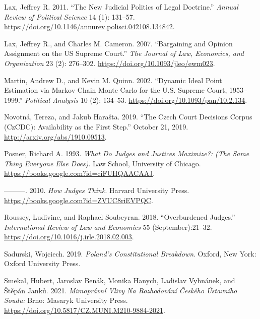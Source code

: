 \documentclass[
  11pt,
]{article}
\newlength{\cslhangindent}
\newenvironment{CSLReferences}[2] %
 {\begin{list}{}{%
  \setlength{\itemindent}{0pt}
  \setlength{\leftmargin}{0pt}
  \setlength{\parsep}{0pt}
  \ifodd #1
   \setlength{\leftmargin}{\cslhangindent}
   \setlength{\itemindent}{-1\cslhangindent}
  \fi
  \setlength{\itemsep}{#2\baselineskip}}}
 {\end{list}}
\begin{document}
\begin{CSLReferences}{1}{0}
Lax, Jeffrey R. 2011. {``The {New Judicial Politics} of {Legal Doctrine}.''} \emph{Annual Review of Political Science} 14 (1): 131--57. \url{https://doi.org/10.1146/annurev.polisci.042108.134842}.

Lax, Jeffrey R., and Charles M. Cameron. 2007. {``Bargaining and {Opinion Assignment} on the {US Supreme Court}.''} \emph{The Journal of Law, Economics, and Organization} 23 (2): 276--302. \url{https://doi.org/10.1093/jleo/ewm023}.

Martin, Andrew D., and Kevin M. Quinn. 2002. {``Dynamic {Ideal Point Estimation} via {Markov Chain Monte Carlo} for the {U}.{S}. {Supreme Court}, 1953--1999.''} \emph{Political Analysis} 10 (2): 134--53. \url{https://doi.org/10.1093/pan/10.2.134}.

Novotná, Tereza, and Jakub Harašta. 2019. {``The {Czech Court Decisions Corpus} ({CzCDC}): {Availability} as the {First Step}.''} October 21, 2019. \url{http://arxiv.org/abs/1910.09513}.

Posner, Richard A. 1993. \emph{What {Do Judges} and {Justices Maximize}?: (The {Same Thing Everyone Else Does})}. Law School, University of Chicago. \url{https://books.google.com?id=ciFUHQAACAAJ}.

---------. 2010. \emph{How {Judges Think}}. Harvard University Press. \url{https://books.google.com?id=ZVUC8riEVPQC}.

Roussey, Ludivine, and Raphael Soubeyran. 2018. {``Overburdened Judges.''} \emph{International Review of Law and Economics} 55 (September):21--32. \url{https://doi.org/10.1016/j.irle.2018.02.003}.

Sadurski, Wojciech. 2019. \emph{Poland's {Constitutional Breakdown}}. Oxford, New York: Oxford University Press.

Smekal, Hubert, Jaroslav Benák, Monika Hanych, Ladislav Vyhnánek, and Štěpán Janků. 2021. \emph{Mimoprávní Vlivy Na Rozhodování Českého {Ústavního} Soudu:} Brno: Masaryk University Press. \url{https://doi.org/10.5817/CZ.MUNI.M210-9884-2021}.


\end{CSLReferences}
\end{document}
